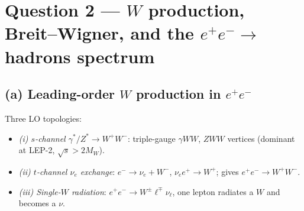 \documentclass[11pt]{article}
\begin{document}
\begin{center}
\end{center}

\section*{Question 2 --- $W$ production, Breit--Wigner, and the $e^+e^-\to$\,hadrons spectrum}

\subsection*{(a) Leading-order $W$ production in $e^+e^-$}

Three LO topologies:
\begin{itemize}
\item \emph{(i) $s$-channel $\gamma^*/Z^*\to W^+W^-$}: triple-gauge $\gamma WW$, $ZWW$ vertices (dominant at LEP-2, $\sqrt s>2M_W$).
\item \emph{(ii) $t$-channel $\nu_e$ exchange}: $e^-\to\nu_e+W^-$, $\nu_e e^+\to W^+$; gives $e^+e^-\to W^+W^-$.
\item \emph{(iii) Single-$W$ radiation}: $e^+e^-\to W^\pm\ell^\mp\nu_\ell$, one lepton radiates a $W$ and becomes a $\nu$.
\end{itemize}
\end{document}
